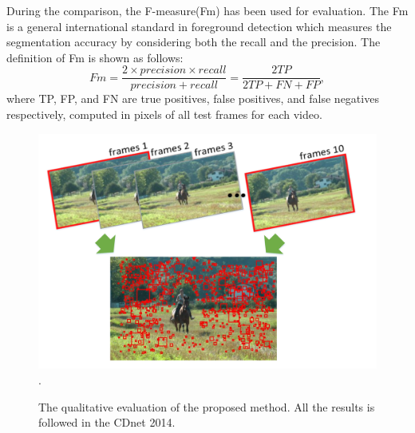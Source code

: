 \documentclass[journal]{IEEEtran}
\begin{document}
During the comparison, the F-measure(Fm) has been used for evaluation. 
The Fm is a general international standard in foreground detection which measures the segmentation accuracy by considering both the recall and the precision. 
The definition of Fm is shown as follows:
\begin{equation}
Fm= \frac{2\times precision \times recall}{precision + recall} = \frac{2TP}{2TP+FN+FP},
\end{equation}
% 
% 
%
where TP, FP, and FN are true positives, false positives, and false negatives respectively, computed in pixels of all test frames for each video. 

\begin{figure}[!t]	\centering
    \includegraphics[width=\textwidth]{figure/fig3}
\DeclareGraphicsExtensions.
    \caption{The qualitative evaluation of the proposed method. All the results is followed in the CDnet 2014.}
    \label{results_chart}
\end{figure}
\end{document}
